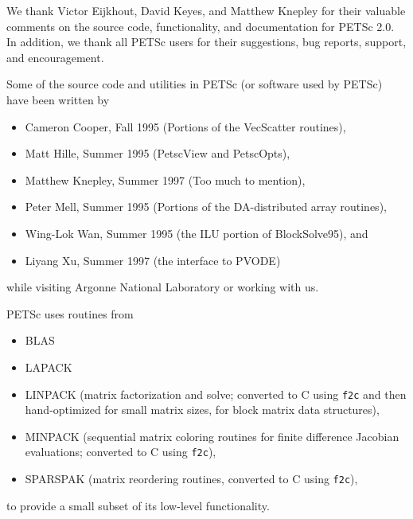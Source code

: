 

\medskip \medskip \noindent
We thank Victor Eijkhout, David Keyes, and Matthew Knepley for their valuable comments on the 
source code, functionality, and documentation  for PETSc 2.0.  
In addition, we thank all PETSc users for
their suggestions, bug reports, support, and encouragement.

\vspace{.3in}
\noindent
Some of the source code and utilities in PETSc (or software used by PETSc)
have been written by 
\begin{itemize}
  \item Cameron Cooper, Fall 1995 (Portions of the VecScatter routines), 
  \item Matt Hille, Summer 1995 (PetscView and PetscOpts), 
  \item Matthew Knepley, Summer 1997 (Too much to mention),
  \item Peter Mell, Summer 1995 (Portions of the DA-distributed array routines),
  \item Wing-Lok Wan, Summer 1995 (the ILU portion of BlockSolve95), and
  \item Liyang Xu, Summer 1997 (the interface to PVODE)
\end{itemize}
while visiting Argonne National Laboratory or working with us.

\vspace{.3in}
\noindent
PETSc uses routines from 
\begin{itemize}
  \item BLAS
  \item LAPACK
  \item LINPACK      (matrix factorization and solve; converted to C using {\tt f2c} and then 
                      hand-optimized for small matrix sizes, for block matrix data structures),
  \item MINPACK      (sequential matrix coloring routines for finite difference Jacobian
                       evaluations; converted to C using {\tt f2c}),
  \item SPARSPAK     (matrix reordering routines, converted to C using {\tt f2c}),
\end{itemize}
to provide a small subset of its low-level functionality.


